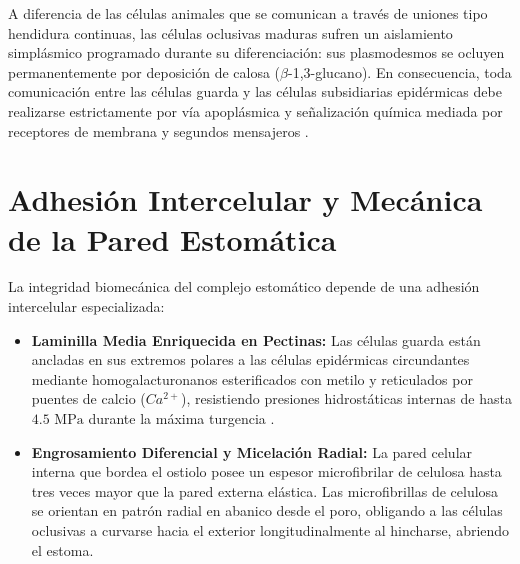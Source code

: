 \documentclass[12pt,spanish,letterpaper,oneside]{article}
\begin{document}
A diferencia de las células animales que se comunican a través de uniones tipo hendidura continuas, las células oclusivas maduras sufren un aislamiento simplásmico programado durante su diferenciación: sus plasmodesmos se ocluyen permanentemente por deposición de calosa ($\beta$-1,3-glucano). En consecuencia, toda comunicación entre las células guarda y las células subsidiarias epidérmicas debe realizarse estrictamente por vía apoplásmica y señalización química mediada por receptores de membrana y segundos mensajeros \parencite{alberts2015}.

\section{Adhesión Intercelular y Mecánica de la Pared Estomática}
La integridad biomecánica del complejo estomático depende de una adhesión intercelular especializada:
\begin{itemize}
    \item \textbf{Laminilla Media Enriquecida en Pectinas:} Las células guarda están ancladas en sus extremos polares a las células epidérmicas circundantes mediante homogalacturonanos esterificados con metilo y reticulados por puentes de calcio ($Ca^{2+}$), resistiendo presiones hidrostáticas internas de hasta $4.5\text{ MPa}$ durante la máxima turgencia \parencite{taiz2015}.
    \item \textbf{Engrosamiento Diferencial y Micelación Radial:} La pared celular interna que bordea el ostiolo posee un espesor microfibrilar de celulosa hasta tres veces mayor que la pared externa elástica. Las microfibrillas de celulosa se orientan en patrón radial en abanico desde el poro, obligando a las células oclusivas a curvarse hacia el exterior longitudinalmente al hincharse, abriendo el estoma.
\end{itemize}
\end{document}
